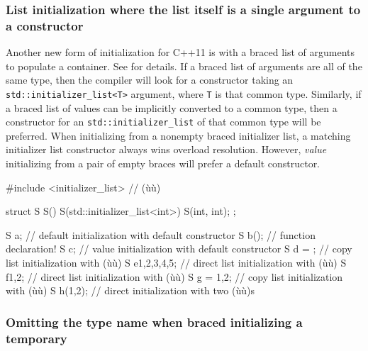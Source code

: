 \subsubsection[List initialization where the list itself is a single argument to a constructor]{List initialization where the list itself is a single argument to a constructor}\label{list-initialization-where-the-list-itself-is-a-single-argument-to-a-constructor}

Another new form of initialization for C++11 is  with a braced list of arguments to populate a container.
See  for details. If a braced list of arguments are
all of the same type, then the compiler will look for a constructor
taking an \lstinline!std::initializer_list<T>! argument, where \lstinline!T!
is that common type. Similarly, if a braced list of values can be
implicitly converted to a common type, then a constructor for an
\lstinline!std::initializer_list! of that common type will be preferred.
When initializing from a nonempty braced initializer list, a matching
initializer list constructor always wins overload resolution. However,
\emph{value} initializing from a pair of empty braces will prefer a
default constructor.

\begin{emcppshiddenlisting}[emcppsbatch=e15]
#include <initializer_list>  // (ù{}ù)
\end{emcppshiddenlisting}
\begin{emcppslisting}[emcppsbatch=e15]
struct S
{
  S() {}
  S(std::initializer_list<int>) {}
  S(int, int);
};

S a;             // default initialization with default constructor
S b();           // function declaration!
S c{};           // value initialization with default constructor
S d = {};        // copy list initialization with (ù{}ù)
S e{1,2,3,4,5};  // direct list initialization with (ù{}ù)
S f{1,2};        // direct list initialization with (ù{}ù)
S g = {1,2};     // copy list initialization with (ù{}ù)
S h(1,2);        // direct initialization with two (ù{}ù)s
\end{emcppslisting}
    

\subsubsection[Omitting the type name when braced initializing a temporary]{Omitting the type name when braced initializing a temporary}\label{omitting-the-type-name-when-braced-initializing-a-temporary}


